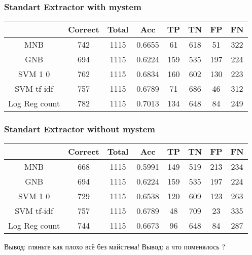 \documentclass[a4paper, 12pt]{article}
\theoremstyle{plain}
\theoremstyle{definition}
\theoremstyle{remark}
\begin{document}
\subsubsection{Standart Extractor with mystem}
\begin{tabular}{|c|c|c|c|c|c|c|c|}
\hline
  ~~~~ & Correct & Total & Acc & TP & TN & FP & FN \\
  \hline
  MNB & 742 & 1115 & 0.6655 & 61 & 618 & 51 & 322  \\
  \hline
  GNB & 694 & 1115 & 0.6224 & 159 & 535 & 197 & 224 \\
  \hline
  SVM 1 0 & 762 & 1115 & 0.6834 & 160 & 602 & 130 & 223 \\
  \hline
  SVM tf-idf & 757 & 1115 & 0.6789 & 71 & 686 & 46 & 312 \\
  \hline
  Log Reg count & 782 & 1115 & 0.7013 & 134 & 648 & 84 & 249 \\
\hline
\end{tabular}


\subsubsection{Standart Extractor without mystem}
\begin{tabular}{|c|c|c|c|c|c|c|c|}
\hline
  ~~~~ & Correct & Total & Acc & TP & TN & FP & FN \\
  \hline
  MNB & 668 & 1115 & 0.5991 & 149 & 519 & 213 & 234  \\
  \hline
  GNB & 694 & 1115 & 0.6224 & 159 & 535 & 197 & 224 \\
  \hline
  SVM 1 0 & 729 & 1115 & 0.6538 & 120 & 609 & 123 & 263 \\
  \hline
  SVM tf-idf & 757 & 1115 & 0.6789 & 48 & 709 & 23 & 335 \\
  \hline
  Log Reg count & 744 & 1115 & 0.6673 & 96 & 648 & 84 & 287 \\
\hline
\end{tabular}

Вывод: гляньте как плохо всё без майстема! Вывод: а что поменялось ?
\end{document}

